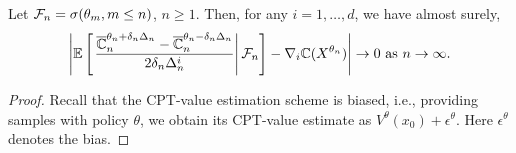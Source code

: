\begin{lemma}
\label{lemma:1spsa-bias}
Let $\mathcal{F}_n = \sigma(\theta_m,m\le n)$, $n\ge 1$.
Then, for any $i = 1,\ldots,d$, we have almost surely,  
\begin{align}
\left| \mathbb{E}\left[\left.\dfrac{\overline {\mathbb{C}}_n^{\theta_n+\delta_n \Delta_n} -\overline {\mathbb{C}}_n^{\theta_n-\delta_n \Delta_n}}{2 \delta_n \Delta_n^{i}}\right| \mathcal{F}_n \right] - \nabla_i \mathbb{C}(X^{\theta_n}) \right| \rightarrow 0 \text{ as } n\rightarrow\infty.
\end{align} 
\end{lemma}
\begin{proof}
Recall that the CPT-value estimation scheme is biased, i.e., providing samples with policy $\theta$, we obtain its CPT-value estimate as $V^{\theta}(x_0) + \epsilon^\theta$. Here $\epsilon^\theta$ denotes the bias. 


\end{proof}
